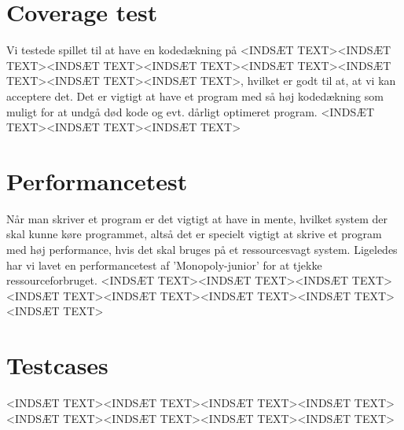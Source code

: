 \section{Coverage test}
Vi testede spillet til at have en kodedækning på <INDSÆT TEXT><INDSÆT TEXT><INDSÆT TEXT><INDSÆT TEXT><INDSÆT TEXT><INDSÆT TEXT><INDSÆT TEXT><INDSÆT TEXT>, hvilket er godt til at, at vi kan acceptere det.
Det er vigtigt at have et program med så høj kodedækning som muligt for at undgå død kode og evt. dårligt optimeret program.
<INDSÆT TEXT><INDSÆT TEXT><INDSÆT TEXT>

\section{Performancetest}
Når man skriver et program er det vigtigt at have in mente, hvilket system der skal kunne køre programmet, altså det er specielt vigtigt at skrive et program med høj performance, hvis det skal bruges på et ressourcesvagt system.
Ligeledes har vi lavet en performancetest af 'Monopoly-junior' for at tjekke ressourceforbruget.
<INDSÆT TEXT><INDSÆT TEXT><INDSÆT TEXT><INDSÆT TEXT><INDSÆT TEXT><INDSÆT TEXT><INDSÆT TEXT><INDSÆT TEXT>


\section{Testcases}
<INDSÆT TEXT><INDSÆT TEXT><INDSÆT TEXT><INDSÆT TEXT><INDSÆT TEXT><INDSÆT TEXT><INDSÆT TEXT><INDSÆT TEXT>